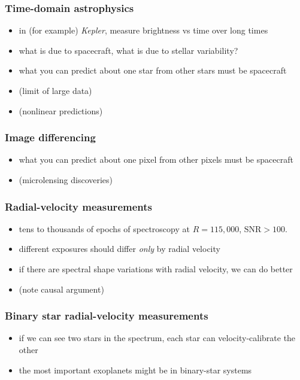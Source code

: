 \documentclass[pdftex]{beamer}
\begin{document}
\begin{frame}
  \frametitle{Time-domain astrophysics}
  \begin{itemize}
  \item in (for example) \textsl{Kepler}, measure brightness vs time over long times
  \item what is due to spacecraft, what is due to stellar variability?
  \item what you can predict about one star from other stars must be spacecraft
  \item (limit of large data)
  \item (nonlinear predictions)
  \end{itemize}
\end{frame}

\begin{frame}
  \frametitle{Image differencing}
  \begin{itemize}
  \item what you can predict about one pixel from other pixels must be spacecraft
  \item (microlensing discoveries)
  \end{itemize}
\end{frame}

\begin{frame}
  \frametitle{Radial-velocity measurements}
  \begin{itemize}
  \item tens to thousands of epochs of spectroscopy at $R=115,000$, $\mathrm{SNR}>100$.
  \item different exposures should differ \emph{only} by radial velocity
  \item if there are spectral shape variations with radial velocity, we can do better
  \item (note causal argument)
  \end{itemize}
\end{frame}

\begin{frame}
  \frametitle{Binary star radial-velocity measurements}
  \begin{itemize}
  \item if we can see two stars in the spectrum, each star can velocity-calibrate the other
  \item the most important exoplanets might be in binary-star systems
  \end{itemize}
\end{frame}
\end{document}
